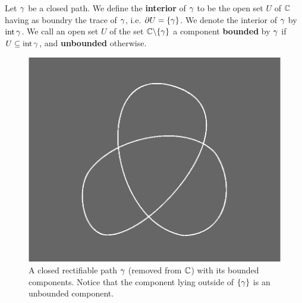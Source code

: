 \begin{definition}
    Let $\gamma$ be a closed path. We define the \textbf{interior} of $\gamma$ to be the
    open set  $U$ of $\mathbb{C}$ having as boundry the trace  of $\gamma$, i.e.
    $\partial{U}=\{\gamma\}$. We denote the interior of $\gamma$ by $\operatorname{int}{\gamma}$. We call
    an open set $U$ of the set $\mathbb{C} \backslash \{\gamma\}$ a component \textbf{bounded}
    by $\gamma$ if $U \subseteq \operatorname{int}{\gamma}$, and \textbf{unbounded} otherwise.
\end{definition}

\begin{figure}[h]
    \centering
    \includegraphics[scale=0.5]{Figures/Chapter4/bounded_components.eps}
    \caption{A closed rectifiable path $\gamma$ (removed from $\mathbb{C}$) with its
        bounded components. Notice that the component lying outside of
    $\{\gamma\}$ is an unbounded component.}
    \label{fugure_4.2}
\end{figure}

